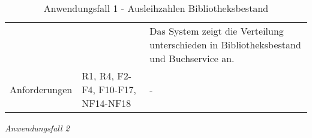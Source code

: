 \begin{table}[h]
\begin{adjustbox}{max width=\textwidth}
\begin{tabular}{lp{7.5cm}p{7.5cm}}
                                         & &Das System zeigt die Verteilung unterschieden in Bibliotheksbestand und Buchservice an.\\

        Anforderungen                   &R1, R4, F2-F4, F10-F17, NF14-NF18& -\\ 
        \bottomrule
    \end{tabular}
    \end{adjustbox}
    \caption{%
    Anwendungsfall 1 - Ausleihzahlen Bibliotheksbestand
    }
    \label{tab:AF_Bibliotheksbestand}
    \end{table}

\endgroup


\newpage
\noindent
\textit{Anwendungsfall 2}


